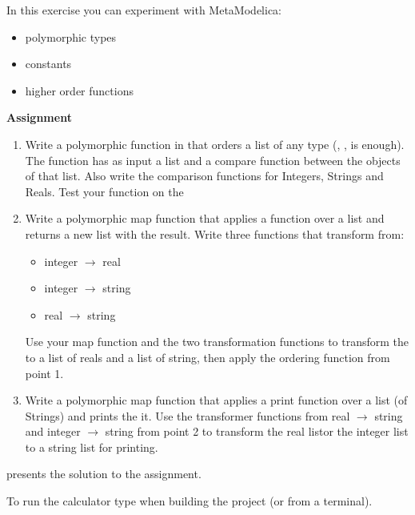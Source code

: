 In this exercise you can experiment with MetaModelica:
\begin{itemize}
\item polymorphic types
\item constants
\item higher order functions
\end{itemize}

{\bf Assignment}

\begin{enumerate}
\item Write a polymorphic function in  that orders a list of any type
  (, ,  is enough).
   The function has as input a list and a compare function between the objects of that list.
   Also write the comparison functions for Integers, Strings and Reals.
   Test your function on the 
\item Write a polymorphic map function that applies a
   function over a list and returns a new list with the result.
   Write three functions that transform from:
   \begin{itemize}
   \item integer $\rightarrow$ real
   \item integer $\rightarrow$ string
   \item real $\rightarrow$ string
   \end{itemize}
   Use your map function and the two transformation functions to transform the
    to a list of reals and a list of string, then apply the
   ordering function from point 1.
\item Write a polymorphic map function that applies a
   print function over a list (of Strings) and prints the it.
   Use the transformer functions from real $\rightarrow$ string and integer $\rightarrow$ string
   from point 2 to transform the real listor the integer list to a
   string list for printing.
\end{enumerate}

 presents the solution to the assignment.

To run the calculator type  when building the project (or  from a terminal).

